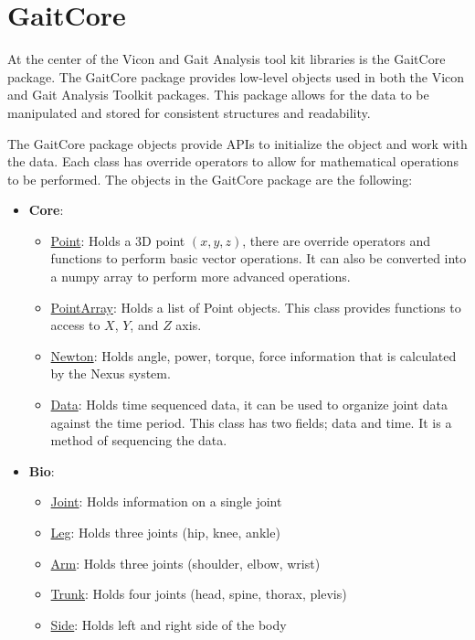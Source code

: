 \section{GaitCore}
At the center of the Vicon and Gait Analysis tool kit libraries is the GaitCore package. The GaitCore package provides low-level objects used in both the Vicon and Gait Analysis Toolkit packages. This package allows for the data to be manipulated and stored for consistent structures and readability.

The GaitCore package objects provide APIs to initialize the object and work with the data. Each class has override operators to allow for mathematical operations to be performed. The objects in the GaitCore package are the following:

\begin{itemize}[noitemsep]
\item \textbf{Core}:
\begin{itemize}[noitemsep]
    \item \underline{Point}: Holds a 3D point $(x,y,z)$, there are override operators and functions to perform basic vector operations. It can also be converted into a numpy array to perform more advanced operations.
    \item \underline{PointArray}: Holds a list of Point objects. This class provides functions to access to $X$, $Y$, and $Z$ axis. 
    \item \underline{Newton}: Holds angle, power, torque, force information that is calculated by the Nexus system. 
    \item \underline{Data}: Holds time sequenced data, it can be used to organize joint data against the time period. This class has two fields; data and time. It is a method of sequencing the data.  
\end{itemize}
\item \textbf{Bio}:
\begin{itemize}
    \item \underline{Joint}: Holds information on a single joint
    \item \underline{Leg}: Holds three joints (hip, knee, ankle)
    \item \underline{Arm}: Holds three joints (shoulder, elbow, wrist)
    \item \underline{Trunk}: Holds four joints (head, spine, thorax, plevis)
    \item \underline{Side}: Holds left and right side of the body
\end{itemize}
\end{itemize}




